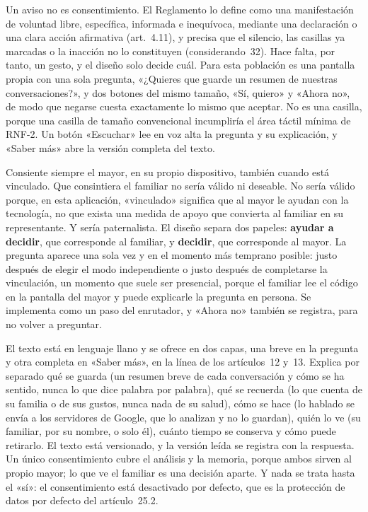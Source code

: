 Un aviso no es consentimiento. El Reglamento lo define como una manifestación de voluntad libre, específica,
informada e inequívoca, mediante una declaración o una clara acción afirmativa (art.~4.11), y precisa que el
silencio, las casillas ya marcadas o la inacción no lo constituyen (considerando~32). Hace falta, por tanto,
un gesto, y el diseño solo decide cuál. Para esta población es una pantalla propia con una sola pregunta,
«¿Quieres que guarde un resumen de nuestras conversaciones?», y dos botones del mismo tamaño, «Sí, quiero» y
«Ahora no», de modo que negarse cuesta exactamente lo mismo que aceptar. No es una casilla, porque una
casilla de tamaño convencional incumpliría el área táctil mínima de RNF-2. Un botón «Escuchar» lee en voz alta
la pregunta y su explicación, y «Saber más» abre la versión completa del texto.

Consiente siempre el mayor, en su propio dispositivo, también cuando está vinculado. Que consintiera el
familiar no sería válido ni deseable. No sería válido porque, en esta aplicación, «vinculado» significa que
al mayor le ayudan con la tecnología, no que exista una medida de apoyo que convierta al familiar en su
representante. Y sería paternalista. El diseño separa dos papeles: \textbf{ayudar a decidir}, que
corresponde al familiar, y \textbf{decidir}, que corresponde al mayor. La pregunta aparece una sola vez y en
el momento más temprano posible: justo después de elegir el modo independiente o justo después de
completarse la vinculación, un momento que suele ser presencial, porque el familiar lee el código en la
pantalla del mayor y puede explicarle la pregunta en persona. Se implementa como un paso del enrutador, y
«Ahora no» también se registra, para no volver a preguntar.

El texto está en lenguaje llano y se ofrece en dos capas, una breve en la pregunta y otra completa en «Saber
más», en la línea de los artículos~12 y~13. Explica por separado qué se guarda (un resumen breve de cada
conversación y cómo se ha sentido, nunca lo que dice palabra por palabra), qué se recuerda (lo que cuenta de
su familia o de sus gustos, nunca nada de su salud), cómo se hace (lo hablado se envía a los servidores de
Google, que lo analizan y no lo guardan), quién lo ve (su familiar, por su nombre, o solo él), cuánto tiempo
se conserva y cómo puede retirarlo. El texto está versionado, y la versión leída se registra con la
respuesta. Un único consentimiento cubre el análisis y la memoria, porque ambos sirven al propio mayor; lo
que ve el familiar es una decisión aparte. Y nada se trata hasta el «sí»: el consentimiento está desactivado
por defecto, que es la protección de datos por defecto del artículo~25.2.

